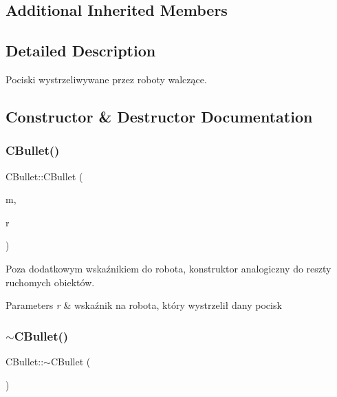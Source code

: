 \subsection*{Additional Inherited Members}


\subsection{Detailed Description}
Pociski wystrzeliwywane przez roboty walczące. 

\subsection{Constructor \& Destructor Documentation}
\mbox{\label{class_c_bullet_a56797cd539f173bbfc8cc9d238734fbc}} 
\subsubsection{\texorpdfstring{C\+Bullet()}{CBullet()}}
{\footnotesize\ttfamily C\+Bullet\+::\+C\+Bullet (\begin{DoxyParamCaption}\item[{\mbox{\hyperlink{class_c_map}{C\+Map}} $\ast$}]{m,  }\item[{\mbox{\hyperlink{class_c_fighting_robot}{C\+Fighting\+Robot}} $\ast$}]{r }\end{DoxyParamCaption})}



Poza dodatkowym wskaźnikiem do robota, konstruktor analogiczny do reszty ruchomych obiektów. 


\begin{DoxyParams}{Parameters}
{\em r} & wskaźnik na robota, który wystrzelił dany pocisk \\
\hline
\end{DoxyParams}
\mbox{\label{class_c_bullet_ac3502e35a7797b9d7d0efef288618a71}} 
\subsubsection{\texorpdfstring{$\sim$\+C\+Bullet()}{~CBullet()}}
{\footnotesize\ttfamily C\+Bullet\+::$\sim$\+C\+Bullet (\begin{DoxyParamCaption}{ }\end{DoxyParamCaption})\hspace{0.3cm}{\ttfamily [virtual]}}



